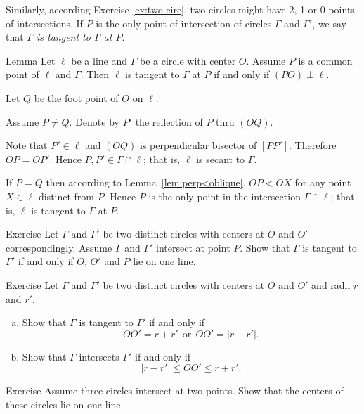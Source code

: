 Similarly, according Exercise \ref{ex:two-circ},
two circles might have 2, 1 or 0 points of intersections.
If $P$ is the only point of intersection of circles $\Gamma$ and $\Gamma'$,
we say that \emph{$\Gamma$ is tangent to $\Gamma$ at $P$}. 

\begin{thm}{Lemma}\label{lem:tangent}
Let $\ell$ be a line and $\Gamma$ be a circle with center $O$.
Assume $P$ is a common point of $\ell$ and $\Gamma$. 
Then $\ell$ is tangent to $\Gamma$ at $P$ if and only if $(PO)\perp \ell$.
\end{thm}

Let $Q$ be the foot point of $O$ on $\ell$.

Assume $P\ne Q$.
Denote by $P'$ the reflection of $P$ thru $(OQ)$.

Note that $P'\in\ell$ and $(OQ)$ is perpendicular bisector of $[PP']$.
Therefore $OP=OP'$.
Hence $P,P'\in \Gamma\cap \ell$;
that is, $\ell$ is  secant to $\Gamma$.

If $P=Q$ then according to Lemma~\ref{lem:perp<oblique},
$OP<OX$ for any point $X\in \ell$ distinct from $P$.
Hence $P$ is the only point in the intersection $\Gamma\cap\ell$;
that is, $\ell$ is tangent to $\Gamma$ at $P$. 
\qeds

\begin{thm}{Exercise}\label{ex:tangent-circles}
Let $\Gamma$ and $\Gamma'$ be two distinct circles with centers at $O$ and $O'$ correspondingly. 
Assume $\Gamma$ and $\Gamma'$ intersect at point $P$.
Show that $\Gamma$ is tangent to $\Gamma'$ if and only if $O$, $O'$ and $P$ lie on one line.
\end{thm}

\begin{thm}{Exercise}\label{ex:tangent-circles-2}
Let $\Gamma$ and $\Gamma'$ be two distinct circles with centers at $O$ and $O'$ and radii $r$ and $r'$.

\begin{enumerate}[(a)]
\item\label{ex:tangent-circles-2:a} Show that $\Gamma$ is tangent to $\Gamma'$ if and only if $$OO'=r+r'\ \ \text{or}\ \  OO'=|r-r'|.$$
\item \label{ex:tangent-circles-2:b}
Show that $\Gamma$ intersects $\Gamma'$ if and only if
$$|r-r'|\le OO'\le r+r'.$$
\end{enumerate}

\end{thm}

\begin{thm}{Exercise}\label{ex:tangent-circles-3}
 Assume three circles  intersect at two points.
 Show that the centers of these circles lie on one line.
\end{thm}

